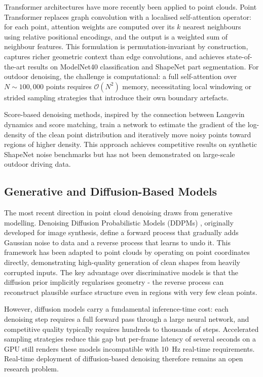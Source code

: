 \documentclass[12pt,a4paper]{article}
\begin{document}
Transformer architectures have more recently been applied to point clouds.
Point Transformer \cite{zhao2021point} replaces graph convolution with a
localised self-attention operator: for each point, attention weights are
computed over its $k$ nearest neighbours using relative positional encodings,
and the output is a weighted sum of neighbour features. This formulation is
permutation-invariant by construction, captures richer geometric context than
edge convolutions, and achieves state-of-the-art results on ModelNet40
classification and ShapeNet part segmentation. For outdoor denoising, the
challenge is computational: a full self-attention over $N \sim 100{,}000$
points requires $\mathcal{O}(N^2)$ memory, necessitating local windowing or
strided sampling strategies that introduce their own boundary artefacts.

Score-based denoising methods, inspired by the connection between Langevin
dynamics and score matching, train a network to estimate the gradient of the
log-density of the clean point distribution and iteratively move noisy points
toward regions of higher density. This approach achieves competitive results
on synthetic ShapeNet noise benchmarks but has not been demonstrated on
large-scale outdoor driving data.

\subsection{Generative and Diffusion-Based Models}

The most recent direction in point cloud denoising draws from generative
modelling. Denoising Diffusion Probabilistic Models (DDPMs) \cite{ho2020ddpm},
originally developed for image synthesis, define a forward process that
gradually adds Gaussian noise to data and a reverse process that learns to
undo it. This framework has been adapted to point clouds by operating on
point coordinates directly, demonstrating high-quality generation of clean
shapes from heavily corrupted inputs. The key advantage over discriminative
models is that the diffusion prior implicitly regularises geometry - the
reverse process can reconstruct plausible surface structure even in regions
with very few clean points.

However, diffusion models carry a fundamental inference-time cost: each
denoising step requires a full forward pass through a large neural network,
and competitive quality typically requires hundreds to thousands of steps.
Accelerated sampling strategies reduce this gap but per-frame latency of
several seconds on a GPU still renders these models incompatible with 10~Hz
real-time requirements. Real-time deployment of diffusion-based denoising
therefore remains an open research problem.
\end{document}
